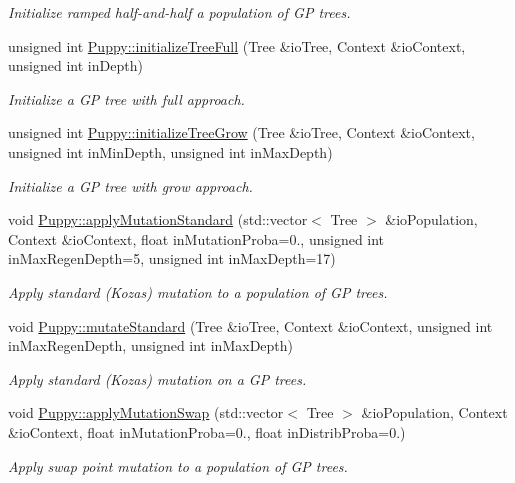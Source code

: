 \begin{DoxyCompactItemize}
\begin{DoxyCompactList}\small\item\em Initialize ramped half-\/and-\/half a population of G\+P trees. \end{DoxyCompactList}\item 
unsigned int \hyperlink{group__Puppy_ga0039778b0dbe47bcf5889d6587f75536}{Puppy\+::initialize\+Tree\+Full} (Tree \&io\+Tree, Context \&io\+Context, unsigned int in\+Depth)
\begin{DoxyCompactList}\small\item\em Initialize a G\+P tree with full approach. \end{DoxyCompactList}\item 
unsigned int \hyperlink{group__Puppy_gac4bc47167b30efa18c41f039b00d4b66}{Puppy\+::initialize\+Tree\+Grow} (Tree \&io\+Tree, Context \&io\+Context, unsigned int in\+Min\+Depth, unsigned int in\+Max\+Depth)
\begin{DoxyCompactList}\small\item\em Initialize a G\+P tree with grow approach. \end{DoxyCompactList}\item 
void \hyperlink{group__Puppy_gae96197fb941007acd222f578815270ff}{Puppy\+::apply\+Mutation\+Standard} (std\+::vector$<$ Tree $>$ \&io\+Population, Context \&io\+Context, float in\+Mutation\+Proba=0., unsigned int in\+Max\+Regen\+Depth=5, unsigned int in\+Max\+Depth=17)
\begin{DoxyCompactList}\small\item\em Apply standard (Koza\textquotesingle{}s) mutation to a population of G\+P trees. \end{DoxyCompactList}\item 
void \hyperlink{group__Puppy_ga169b89be413e3893bb96392b8c06fca9}{Puppy\+::mutate\+Standard} (Tree \&io\+Tree, Context \&io\+Context, unsigned int in\+Max\+Regen\+Depth, unsigned int in\+Max\+Depth)
\begin{DoxyCompactList}\small\item\em Apply standard (Koza\textquotesingle{}s) mutation on a G\+P trees. \end{DoxyCompactList}\item 
void \hyperlink{group__Puppy_ga5c961ca57a2b983b762d9b1733642cf0}{Puppy\+::apply\+Mutation\+Swap} (std\+::vector$<$ Tree $>$ \&io\+Population, Context \&io\+Context, float in\+Mutation\+Proba=0., float in\+Distrib\+Proba=0.)
\begin{DoxyCompactList}\small\item\em Apply swap point mutation to a population of G\+P trees. \end{DoxyCompactList}\item 

\end{DoxyCompactItemize}

